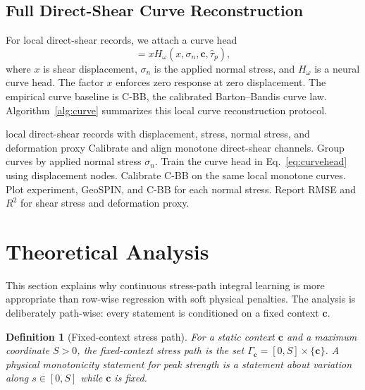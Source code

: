 \documentclass[journal]{IEEEtran}
\newtheorem{definition}{Definition}
\begin{document}
\subsection{Full Direct-Shear Curve Reconstruction}
For local direct-shear records, we attach a curve head
\begin{equation}
[\widehat{\tau}(x,\sigma_n,\mathbf{c}),\widehat d(x,\sigma_n,\mathbf{c})]=xH_{\omega}(x,\sigma_n,\mathbf{c},\widehat{\tau}_p),
\label{eq:curvehead}
\end{equation}
where $x$ is shear displacement, $\sigma_n$ is the applied normal stress, and $H_{\omega}$ is a neural curve head. The factor $x$ enforces zero response at zero displacement. The empirical curve baseline is C-BB, the calibrated Barton--Bandis curve law. Algorithm~\ref{alg:curve} summarizes this local curve reconstruction protocol.

\begin{algorithm}[t]
\caption{Local Direct-Shear Curve Reconstruction}
\label{alg:curve}
\begin{algorithmic}[1]
\REQUIRE local direct-shear records with displacement, stress, normal stress, and deformation proxy
\STATE Calibrate and align monotone direct-shear channels.
\STATE Group curves by applied normal stress $\sigma_n$.
\STATE Train the curve head in Eq.~\eqref{eq:curvehead} using displacement nodes.
\STATE Calibrate C-BB on the same local monotone curves.
\STATE Plot experiment, GeoSPIN, and C-BB for each normal stress.
\STATE Report RMSE and $R^2$ for shear stress and deformation proxy.
\end{algorithmic}
\end{algorithm}

\section{Theoretical Analysis}
\label{sec:theory}
This section explains why continuous stress-path integral learning is more appropriate than row-wise regression with soft physical penalties. The analysis is deliberately path-wise: every statement is conditioned on a fixed context $\mathbf{c}$.

\begin{definition}[Fixed-context stress path]
For a static context $\mathbf{c}$ and a maximum coordinate $S>0$, the fixed-context stress path is the set $\Gamma_{\mathbf{c}}=[0,S]\times\{\mathbf{c}\}$. A physical monotonicity statement for peak strength is a statement about variation along $s\in[0,S]$ while $\mathbf{c}$ is fixed.
\end{definition}
\end{document}
